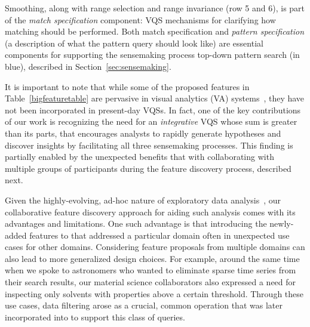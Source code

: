  Smoothing, along with range selection and range invariance (row 5 and 6), is part of the \emph{match specification} component: VQS mechanisms for clarifying how matching should be performed. Both match specification and \emph{pattern specification} (a description of what the pattern query should look like) are essential components for supporting the sensemaking process top-down pattern search (in blue), described in Section~\ref{sec:sensemaking}.
 \par It is important to note that while some of the proposed features in Table~\ref{bigfeaturetable} are pervasive in  visual analytics (VA) systems~\cite{Heer2012,Amar2005}, they have not been incorporated in present-day VQSs. In fact, one of the key contributions of our work is recognizing the need for an \emph{integrative} VQS whose sum is greater than its parts, that encourages analysts to rapidly generate hypotheses and discover insights by facilitating all three sensemaking processes. This finding is partially enabled by the unexpected benefits that  with collaborating with multiple groups of participants during the feature discovery process, described next.
 \par Given the highly-evolving, ad-hoc nature of exploratory data analysis~\cite{Keim2006,Tukey1970}, our collaborative feature discovery approach for aiding such analysis comes with its advantages and limitations. One such advantage is that introducing the newly-added features to \zvpp that addressed a particular domain often  in unexpected use cases for other domains. Considering feature proposals from multiple domains can also lead to more generalized design choices. For example, around the same time when we spoke to astronomers who wanted to eliminate sparse time series from their search results, our material science collaborators also expressed a need for inspecting only solvents with properties above a certain threshold. Through these use cases, data filtering arose as a crucial, common operation that was later incorporated into \zvpp to support this class of queries. %
